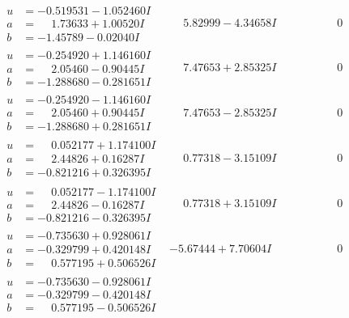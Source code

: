 \documentclass[1p]{elsarticle_modified}
\theoremstyle{definition}
\begin{document}
$$\begin{array}{c|c|c}
\begin{aligned}
u &= -0.519531 - 1.052460 I \\
a &= \phantom{-}1.73633 + 1.00520 I \\
b &= -1.45789 - 0.02040 I\end{aligned}
 & \phantom{-}5.82999 - 4.34658 I & \phantom{-0.000000 } 0 \\ \hline\begin{aligned}
u &= -0.254920 + 1.146160 I \\
a &= \phantom{-}2.05460 - 0.90445 I \\
b &= -1.288680 - 0.281651 I\end{aligned}
 & \phantom{-}7.47653 + 2.85325 I & \phantom{-0.000000 } 0 \\ \hline\begin{aligned}
u &= -0.254920 - 1.146160 I \\
a &= \phantom{-}2.05460 + 0.90445 I \\
b &= -1.288680 + 0.281651 I\end{aligned}
 & \phantom{-}7.47653 - 2.85325 I & \phantom{-0.000000 } 0 \\ \hline\begin{aligned}
u &= \phantom{-}0.052177 + 1.174100 I \\
a &= \phantom{-}2.44826 + 0.16287 I \\
b &= -0.821216 + 0.326395 I\end{aligned}
 & \phantom{-}0.77318 - 3.15109 I & \phantom{-0.000000 } 0 \\ \hline\begin{aligned}
u &= \phantom{-}0.052177 - 1.174100 I \\
a &= \phantom{-}2.44826 - 0.16287 I \\
b &= -0.821216 - 0.326395 I\end{aligned}
 & \phantom{-}0.77318 + 3.15109 I & \phantom{-0.000000 } 0 \\ \hline\begin{aligned}
u &= -0.735630 + 0.928061 I \\
a &= -0.329799 + 0.420148 I \\
b &= \phantom{-}0.577195 + 0.506526 I\end{aligned}
 & -5.67444 + 7.70604 I & \phantom{-0.000000 } 0 \\ \hline\begin{aligned}
u &= -0.735630 - 0.928061 I \\
a &= -0.329799 - 0.420148 I \\
b &= \phantom{-}0.577195 - 0.506526 I\end{aligned}

\end{array}$$
\end{document}
